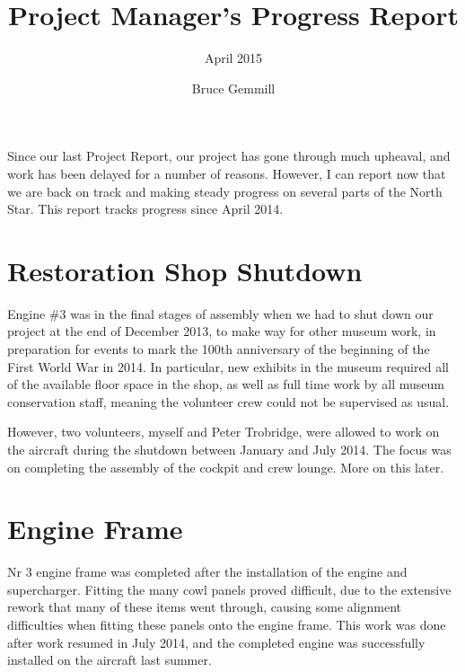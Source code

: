 %


\title{Project Manager's Progress Report}
\subtitle{April 2015}
\author{Bruce Gemmill}

\maketitle

Since our last Project Report, our project has gone through much
upheaval, and work has been delayed for a number of reasons.  However,
I can report now that we are back on track and making steady progress
on several parts of the North Star. This report tracks progress since
April 2014.

\section{Restoration Shop Shutdown}
\label{sec:restoration_shop}

Engine \#3 was in the final stages of assembly when we had to shut down
our project at the end of December 2013, to make way for other museum
work, in preparation for events to mark the 100th anniversary of the
beginning of the First World War in 2014.  In particular, new exhibits
in the museum required all of the available floor space in the shop,
as well as full time work by all museum conservation staff, meaning
the volunteer crew could not be supervised as usual.

However, two volunteers, myself and Peter Trobridge, were allowed to
work on the aircraft during the shutdown between January and July
2014.  The focus was on completing the assembly of the cockpit and
crew lounge.  More on this later.

\section{Engine Frame}
\label{sec:engine_frame}

Nr 3 engine frame was completed after the installation of the engine
and supercharger.  Fitting the many cowl panels proved difficult, due
to the extensive rework that many of these items went through, causing
some alignment difficulties when fitting these panels onto the engine
frame.  This work was done after work resumed in July 2014, and the
completed engine was successfully installed on the aircraft last
summer.


